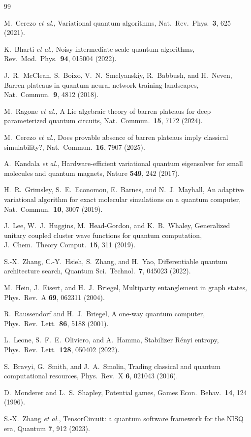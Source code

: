 \documentclass[a4paper,onecolumn,noarxiv]{quantumarticle}
\begin{document}
\begin{thebibliography}{99}

 M.~Cerezo \textit{et al.}, Variational quantum algorithms, Nat.\ Rev.\ Phys.\ \textbf{3}, 625 (2021).

 K.~Bharti \textit{et al.}, Noisy intermediate-scale quantum algorithms, Rev.\ Mod.\ Phys.\ \textbf{94}, 015004 (2022).

 J.~R.~McClean, S.~Boixo, V.~N.~Smelyanskiy, R.~Babbush, and H.~Neven, Barren plateaus in quantum neural network training landscapes, Nat.\ Commun.\ \textbf{9}, 4812 (2018).

 M.~Ragone \textit{et al.}, A Lie algebraic theory of barren plateaus for deep parameterized quantum circuits, Nat.\ Commun.\ \textbf{15}, 7172 (2024).

 M.~Cerezo \textit{et al.}, Does provable absence of barren plateaus imply classical simulability?, Nat.\ Commun.\ \textbf{16}, 7907 (2025).

 A.~Kandala \textit{et al.}, Hardware-efficient variational quantum eigensolver for small molecules and quantum magnets, Nature \textbf{549}, 242 (2017).

 H.~R.~Grimsley, S.~E.~Economou, E.~Barnes, and N.~J.~Mayhall, An adaptive variational algorithm for exact molecular simulations on a quantum computer, Nat.\ Commun.\ \textbf{10}, 3007 (2019).

 J.~Lee, W.~J.~Huggins, M.~Head-Gordon, and K.~B.~Whaley, Generalized unitary coupled cluster wave functions for quantum computation, J.\ Chem.\ Theory Comput.\ \textbf{15}, 311 (2019).

 S.-X.~Zhang, C.-Y.~Hsieh, S.~Zhang, and H.~Yao, Differentiable quantum architecture search, Quantum Sci.\ Technol.\ \textbf{7}, 045023 (2022).

 M.~Hein, J.~Eisert, and H.~J.~Briegel, Multiparty entanglement in graph states, Phys.\ Rev.\ A \textbf{69}, 062311 (2004).

 R.~Raussendorf and H.~J.~Briegel, A one-way quantum computer, Phys.\ Rev.\ Lett.\ \textbf{86}, 5188 (2001).

 L.~Leone, S.~F.~E.~Oliviero, and A.~Hamma, Stabilizer R\'enyi entropy, Phys.\ Rev.\ Lett.\ \textbf{128}, 050402 (2022).

 S.~Bravyi, G.~Smith, and J.~A.~Smolin, Trading classical and quantum computational resources, Phys.\ Rev.\ X \textbf{6}, 021043 (2016).

 D.~Monderer and L.~S.~Shapley, Potential games, Games Econ.\ Behav.\ \textbf{14}, 124 (1996).

 S.-X.~Zhang \textit{et al.}, TensorCircuit: a quantum software framework for the NISQ era, Quantum \textbf{7}, 912 (2023).

\end{thebibliography}
\end{document}
